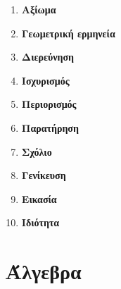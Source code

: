 \documentclass[twoside,10pt]{book}
\begin{document}
\begin{enumerate}[label=\large{\bf B-\arabic*.}]
\item \textbf{Αξίωμα}\\
\item \textbf{Γεωμετρική ερμηνεία}\\
\item \textbf{Διερεύνηση}\\
\item \textbf{Ισχυρισμός}\\
\item \textbf{Περιορισμός}\\
\item \textbf{Παρατήρηση}\\
\item \textbf{Σχόλιο}\\
\item \textbf{Γενίκευση}\\
\item \textbf{Εικασία}\\
\item \textbf{Ιδιότητα}\\
\end{enumerate}
\mainmatter
\pagestyle{fancy}
\chapter{Άλγεβρα}
\end{document}
